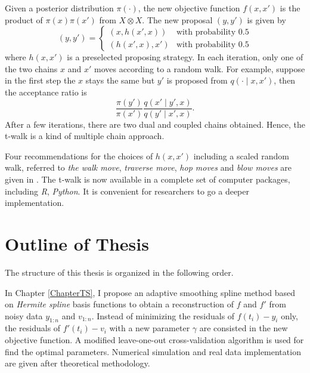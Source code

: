 Given a posterior distribution $\pi(\cdot)$, the new objective function $f(x,x')$ is the product of $\pi(x)\pi(x')$ from $X \otimes X$. The new proposal $(y,y')$ is given by
\begin{equation*} (y,y') =
\begin{cases}
\left(x,h(x',x)\right) & \mbox{with probability 0.5}\\
\left(h(x',x),x'\right) & \mbox{with probability 0.5}
\end{cases}
\end{equation*}
where $h(x,x')$ is a preselected proposing strategy. In each iteration, only one of the two chains $x$ and $x'$ moves according to a random walk. For example, suppose in the first step the $x$ stays the same but $y'$ is proposed from $q(\cdot\mid x,x')$, then the acceptance ratio is 
\begin{equation*}
\frac{\pi\left(y'\right)}{\pi\left(x'\right)}\frac{q\left(x'\mid y',x\right) }{q\left(y'\mid x',x\right)}. 
\end{equation*}
After a few iterations, there are two dual and coupled chains obtained. Hence, the t-walk is a kind of multiple chain approach. 

Four recommendations for the choices of $h\left(x,x'\right)$ including a scaled random walk, referred to \textit{the walk move}, \textit{traverse move}, \textit{hop moves} and \textit{blow moves} are given in \cite{christen2010general}. The t-walk is now available in a complete set of computer packages, including \textit{R}, \textit{Python}. It is convenient for researchers to go a deeper implementation. 



\section{Outline of Thesis}

The structure of this thesis is organized in the following order. 

In Chapter \ref{ChapterTS}, I propose an adaptive smoothing spline method based on \textit{Hermite spline} basis functions to obtain a reconstruction of $f$ and $f'$ from noisy data $y_{1:n}$ and $v_{1:n}$. Instead of minimizing the residuals of $f(t_i)-y_i$ only, the residuals of $f'(t_i)-v_i$ with a new parameter $\gamma$ are consisted in the new objective function. A modified leave-one-out cross-validation algorithm is used for find the optimal parameters. Numerical simulation and real data implementation are given after theoretical methodology. 

